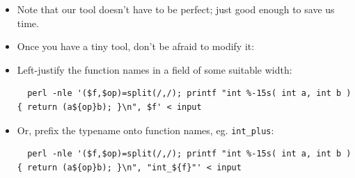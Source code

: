 \documentclass[handout,]{beamer}
\newcommand{\pitem}{\pause \item}
\begin{document}
\begin{frame}[fragile]
    \begin{itemize}
    \item
      Note that our tool doesn't have to be perfect;
      just good enough to save us time.
 
    \pitem
    Once you have a tiny tool, don't be afraid to modify it:

    \item
    Left-justify the function names in a field of some suitable width:

\tiny
\begin{verbatim}
  perl -nle '($f,$op)=split(/,/); printf "int %-15s( int a, int b ) { return (a${op}b); }\n", $f' < input
\end{verbatim}
\small

    \pitem
    Or, prefix the typename onto function names, eg. \verb+int_plus+:

\tiny
\begin{verbatim}
  perl -nle '($f,$op)=split(/,/); printf "int %-15s( int a, int b ) { return (a${op}b); }\n", "int_${f}"' < input
\end{verbatim}
\small


%
%
%



\end{itemize}
\end{frame}
\end{document}

